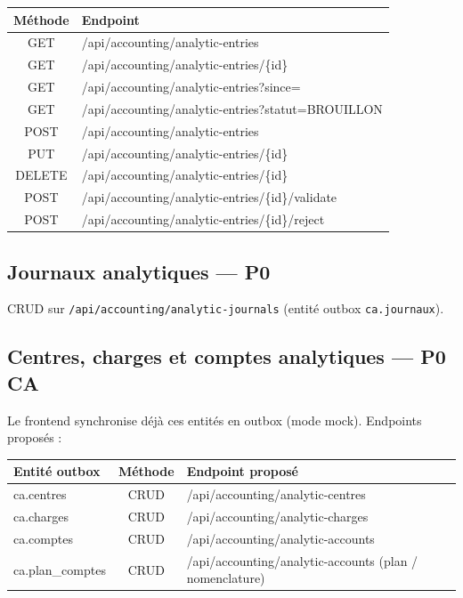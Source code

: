 \documentclass[12pt,a4paper]{report}
\begin{document}
\begin{longtable}{@{}cp{7cm}@{}}
\hline
\textbf{Méthode} & \textbf{Endpoint} \\
\hline
\endhead
GET & /api/accounting/analytic-entries \\
\hline
GET & /api/accounting/analytic-entries/\{id\} \\
\hline
GET & /api/accounting/analytic-entries?since= \\
\hline
GET & /api/accounting/analytic-entries?statut=BROUILLON \\
\hline
POST & /api/accounting/analytic-entries \\
\hline
PUT & /api/accounting/analytic-entries/\{id\} \\
\hline
DELETE & /api/accounting/analytic-entries/\{id\} \\
\hline
POST & /api/accounting/analytic-entries/\{id\}/validate \\
\hline
POST & /api/accounting/analytic-entries/\{id\}/reject \\
\hline
\end{longtable}

\subsection{Journaux analytiques --- P0}

CRUD sur \texttt{/api/accounting/analytic-journals} (entité outbox \texttt{ca.journaux}).

\subsection{Centres, charges et comptes analytiques --- P0 CA}

Le frontend synchronise déjà ces entités en outbox (mode mock). Endpoints proposés :

\begin{longtable}{@{}p{3.2cm}cp{6.5cm}@{}}
\hline
\textbf{Entité outbox} & \textbf{Méthode} & \textbf{Endpoint proposé} \\
\hline
\endhead
ca.centres & CRUD & /api/accounting/analytic-centres \\
\hline
ca.charges & CRUD & /api/accounting/analytic-charges \\
\hline
ca.comptes & CRUD & /api/accounting/analytic-accounts \\
\hline
ca.plan\_comptes & CRUD & /api/accounting/analytic-accounts (plan / nomenclature) \\
\hline
\end{longtable}
\end{document}
